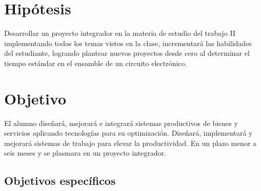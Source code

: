 \section{Hipótesis}
% 
% 
% 
% 
Desarrollar un proyecto integrador en la materia de estudio del trabajo II implementando todos los temas vistos en la clase, incrementará las habilidades del estudiante, logrando plantear nuevos proyectos desde cero al determinar el tiempo estándar en el ensamble de un circuito electrónico.
% 
%  
\section{Objetivo}

% 
% 
% 
%
El alumno diseñará, mejorará e integrará sistemas productivos de bienes y servicios aplicando tecnologías para su optimización.
Diseñará, implementará y mejorará sistemas de trabajo para elevar la productividad.
En un plazo menor a seis meses y se plasmara en un proyecto integrador.
%
%
\subsection{Objetivos específicos }


